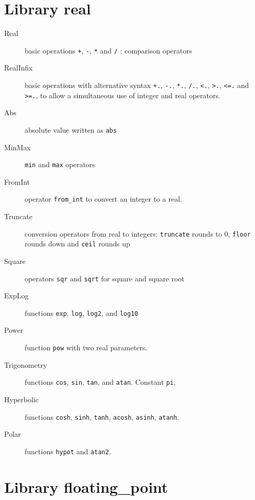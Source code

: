 \section{Library real}

\begin{description}

\item[Real] basic operations \verb|+|, \verb|-|, \verb|*| and \verb|/| ;
  comparison operators

\item[RealInfix] basic operations with alternative syntax \verb|+.|,
  \verb|-.|, \verb|*.|, \verb|/.|, \verb|<.|, \verb|>.|, \verb|<=.| and \verb|>=.|, to
  allow a simultaneous use of integer and real operators.

\item[Abs] absolute value written as \verb|abs|

\item[MinMax] \verb|min| and \verb|max| operators

\item[FromInt] operator \verb|from_int| to convert an integer to a real.

\item[Truncate] conversion operators from real to integers:
  \verb|truncate| rounds to 0, \verb|floor| rounds down and
  \verb|ceil| rounds up

\item[Square] operators \verb|sqr| and \verb|sqrt| for square and square root

\item[ExpLog] functions \verb|exp|, \verb|log|, \verb|log2|, and \verb|log10|

\item[Power] function \verb|pow| with two real parameters.

\item[Trigonometry] functions \verb|cos|, \verb|sin|, \verb|tan|, and
  \verb|atan|. Constant \verb|pi|.

\item[Hyperbolic] functions \verb|cosh|, \verb|sinh|, \verb|tanh|,
  \verb|acosh|, \verb|asinh|, \verb|atanh|.

\item[Polar] functions \verb|hypot| and \verb|atan2|.

\end{description}

\section{Library floating\_point}

